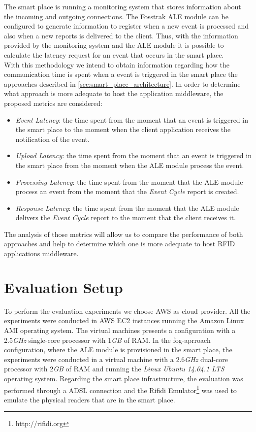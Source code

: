 The smart place is running a monitoring system that stores information about the incoming and outgoing
connections. The Fosstrak \gls{ALE} module can be configured to generate information to register
when a new event is processed and also when a new reports is delivered to the client. Thus, with the
information provided by the monitoring system and the \gls{ALE} module it is possible to calculate
the latency request for an event that occurs in the smart place.\\

With this methodology we intend to obtain information regarding how the communication time is spent
when a event is triggered in the smart place the approaches described in \ref{sec:smart_place_architecture}.
In order to determine what approach is more adequate to host the application middleware, the proposed
metrics are considered:

\begin{itemize}
  \item \textit{Event Latency}: the time spent from the moment that an event is triggered in the
  smart place to the moment when the client application receives the notification of the event.
  \item \textit{Upload Latency}: the time spent from the moment that an event is triggered in the
  smart place from the moment when the \gls{ALE} module process the event.
  \item \textit{Processing Latency}: the time spent from the moment that the \gls{ALE} module process
  an event from the moment that the \textit{Event Cycle} report is created.
  \item \textit{Response Latency}: the time spent from the moment that the \gls{ALE} module delivers
  the \textit{Event Cycle} report to the moment that the client receives it.
\end{itemize}

The analysis of those metrics will allow us to compare the performance of both approaches and help to
determine which one is more adequate to host \gls{RFID} applications middleware.

\section{Evaluation Setup}
\label{sec:eval_setup}
To perform the evaluation experiments we choose \gls{AWS} as cloud provider. All the experiments were
conducted in \gls{AWS} \gls{EC2} instances running the Amazon Linux AMI operating system. The virtual
machines presents a configuration with a 2.5\textit{\gls{GHz}} single-core processor with 1\textit{\gls{GB}} of
\gls{RAM}. In the fog-aprroach configuration, where the \gls{ALE} module is provisioned in the smart place,
the experiments were conducted in a virtual machine with a 2.6\textit{\gls{GHz}} dual-core processor
with 2\textit{\gls{GB}} of \gls{RAM} and running the \textit{Linux Ubuntu 14.04.1 LTS} operating system.
Regarding the smart place infrastructure, the evaluation was performed through a \gls{ADSL} connection
and the Rifidi Emulator\footnote{http://rifidi.org} was used to emulate the physical readers that are
in the smart place.\\

